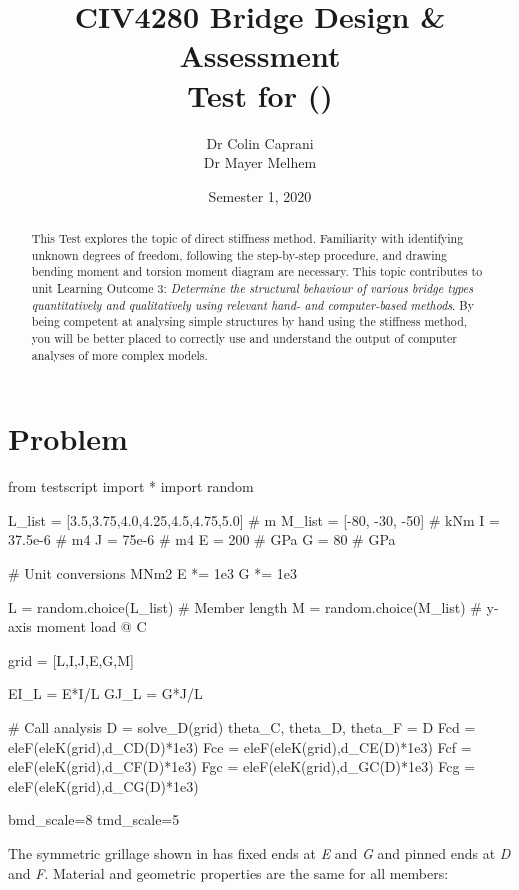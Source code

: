 \documentclass[a4paper,11pt]{article}
\title{CIV4280 Bridge Design \& Assessment\\Test for \VAR{FullName} (\VAR{StudentID})}
\date{Semester 1, 2020}
\author{Dr Colin Caprani\\Dr Mayer Melhem}
\begin{document}
\maketitle

\begin{abstract}
	This Test explores the topic of direct stiffness method. Familiarity with identifying unknown degrees of freedom, following the step-by-step procedure, and drawing bending moment and torsion moment diagram are necessary. This topic contributes to unit Learning Outcome 3: \textit{Determine the structural behaviour of various bridge types quantitatively and qualitatively using relevant hand- and computer-based methods}. By being competent at analysing simple structures by hand using the stiffness method, you will be better placed to correctly use and understand the output of computer analyses of more complex models.
\end{abstract}

\newpage

\section{Problem}

\begin{pycode}
	from testscript import *
	import random
	
	L_list = [3.5,3.75,4.0,4.25,4.5,4.75,5.0]  # m
	M_list = [-80, -30, -50]	# kNm
	I = 37.5e-6 	# m4
	J = 75e-6   	# m4
	E = 200     	# GPa
	G = 80      	# GPa
	
	# Unit conversions MNm2
	E *= 1e3
	G *= 1e3
	
	L = random.choice(L_list) 		# Member length
	M = random.choice(M_list) 		# y-axis moment load @ C
	
	grid = [L,I,J,E,G,M]
	
	EI_L = E*I/L
	GJ_L = G*J/L
	
	# Call analysis
	D = solve_D(grid)
	theta_C, theta_D, theta_F = D
	Fcd = eleF(eleK(grid),d_CD(D)*1e3)
	Fce = eleF(eleK(grid),d_CE(D)*1e3)
	Fcf = eleF(eleK(grid),d_CF(D)*1e3)
	Fgc = eleF(eleK(grid),d_GC(D)*1e3)
	Fcg = eleF(eleK(grid),d_CG(D)*1e3)
	
	bmd_scale=8
	tmd_scale=5
\end{pycode}

The symmetric grillage shown in  has fixed ends at \emph{E} and \emph{G} and
pinned ends at \emph{D} and \emph{F}. Material and geometric properties are the same for all members: 
\end{document}
